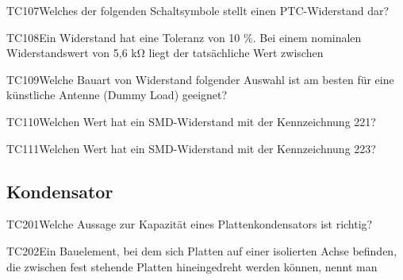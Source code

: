 \begin{question}{TC107}{Welches der folgenden Schaltsymbole stellt einen PTC-Widerstand dar?}
\end{question}

\begin{question}{TC108}{Ein Widerstand hat eine Toleranz von 10 \%. Bei einem nominalen Widerstandswert von 5,6 kΩ liegt der tatsächliche Wert zwischen}
\end{question}

\begin{question}{TC109}{Welche Bauart von Widerstand folgender Auswahl ist am besten für eine künstliche Antenne (Dummy Load) geeignet?}
\end{question}

\begin{question}{TC110}{Welchen Wert hat ein SMD-Widerstand mit der Kennzeichnung 221?}
\end{question}

\begin{question}{TC111}{Welchen Wert hat ein SMD-Widerstand mit der Kennzeichnung 223?}
\end{question}

\subsection{Kondensator}

\begin{question}{TC201}{Welche Aussage zur Kapazität eines Plattenkondensators ist richtig?}
\end{question}

\begin{question}{TC202}{Ein Bauelement, bei dem sich Platten auf einer isolierten Achse befinden, die zwischen fest stehende Platten hineingedreht werden können, nennt man}
\end{question}

